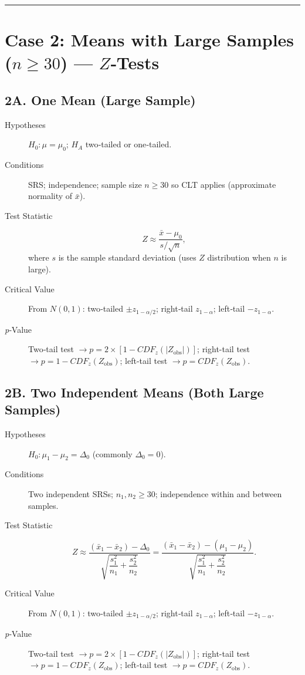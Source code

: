\documentclass[12pt]{article}
\begin{document}
\bigskip\hrule\bigskip

\section*{Case 2: Means with Large Samples ($n\ge30$) — $Z$‐Tests}
\subsection*{2A. One Mean (Large Sample)}
\begin{description}
  \item[Hypotheses] $H_0\!: \mu=\mu_0$; $H_A$ two‐tailed or one‐tailed.
  \item[Conditions] SRS; independence; sample size $n\ge30$ so CLT applies (approximate normality of $\bar x$).
  \item[Test Statistic] \[ Z \approx \dfrac{\bar x-\mu_0}{s/\sqrt n}, \] where $s$ is the sample standard deviation (uses $Z$ distribution when $n$ is large).
  \item[Critical Value] From $N(0,1)$: two‐tailed $\pm z_{1-\alpha/2}$; right‐tail $z_{1-\alpha}$; left‐tail $-z_{1-\alpha}$.
  \item[\emph{p}‐Value] Two‐tail test $\rightarrow p=2\times[1-CDF_z(|Z_{\text{obs}}|)]$; right-tail test $\rightarrow p=1-CDF_z(Z_{\text{obs}})$; left-tail test  $\rightarrow p=CDF_z(Z_{\text{obs}})$.
\end{description}

\subsection*{2B. Two Independent Means (Both Large Samples)}
\begin{description}
  \item[Hypotheses] $H_0\!: \mu_1-\mu_2=\Delta_0$ (commonly $\Delta_0=0$).
  \item[Conditions] Two independent SRSs; $n_1,n_2\ge30$; independence within and between samples.
  \item[Test Statistic] \[ Z \approx \dfrac{(\bar x_1-\bar x_2)-\Delta_0}{\sqrt{\dfrac{s_1^2}{n_1}+\dfrac{s_2^2}{n_2}}} = \dfrac{(\bar x_1-\bar x_2)-(\mu_1-\mu_2)}{\sqrt{\dfrac{s_1^2}{n_1}+\dfrac{s_2^2}{n_2}}}. \]
  \item[Critical Value] From $N(0,1)$: two‐tailed $\pm z_{1-\alpha/2}$; right‐tail $z_{1-\alpha}$; left‐tail $-z_{1-\alpha}$.
  \item[\emph{p}‐Value] Two‐tail test $\rightarrow p=2\times[1-CDF_z(|Z_{\text{obs}}|)]$; right-tail test $\rightarrow p=1-CDF_z(Z_{\text{obs}})$; left-tail test  $\rightarrow p=CDF_z(Z_{\text{obs}})$.
\end{description}
\end{document}
